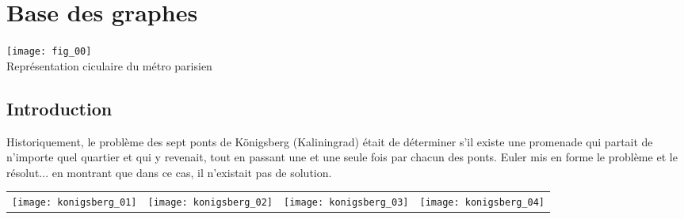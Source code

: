 \chapter*{Base des graphes} 
 

\begin{marginfigure}
\texttt{[image: fig\_00]} \\
\caption{Représentation ciculaire du métro parisien}
\end{marginfigure}%



% 
%


\section{Introduction}
Historiquement, le problème des sept ponts de Königsberg (Kaliningrad) était de déterminer s'il existe une promenade qui partait de n'importe quel quartier et qui y revenait, tout en passant une et une seule fois par chacun des ponts.
Euler mis en forme le problème et le résolut... en montrant que dans ce cas, il n'existait pas de solution.
\begin{center}
\begin{tabular}{cccc}
\texttt{[image: konigsberg\_01]} &
\texttt{[image: konigsberg\_02]} &
\texttt{[image: konigsberg\_03]} &
\texttt{[image: konigsberg\_04]} \\
\end{tabular}
\end{center}

